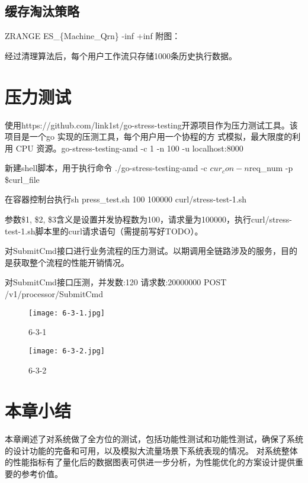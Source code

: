 \subsection{缓存淘汰策略}
ZRANGE ES\_\{Machine\_Qrn\} -inf +inf
附图：

经过清理算法后，每个用户工作流只存储1000条历史执行数据。


\section{压力测试}


使用https://github.com/link1st/go-stress-testing开源项目作为压力测试工具。该项目是一个go 实现的压测工具，每个用户用一个协程的方
式模拟，最大限度的利用 CPU 资源。go-stress-testing-amd -c 1 -n 100 -u localhost:8000

新建shell脚本，用于执行命令 ./go-stress-testing-amd -c $cur_con -n $req\_num -p \$curl\_file

在容器控制台执行sh press\_test.sh 100 100000 curl/stress-test-1.sh\cite{zw5}

参数\$1, \$2, \$3含义是设置并发协程数为100，请求量为100000，执行curl/stress-test-1.sh脚本里的curl请求语句（需提前写好TODO）。

对SubmitCmd接口进行业务流程的压力测试。以期调用全链路涉及的服务，目的是获取整个流程的性能开销情况。


对SubmitCmd接口压测，并发数:120 请求数:20000000
POST /v1/processor/SubmitCmd

\begin{figure}[H]
    \centering
    \texttt{[image: 6-3-1.jpg]}
    \caption{6-3-1}
    \label{fig:6-3-1}
\end{figure}

\begin{figure}[H]
    \centering
    \texttt{[image: 6-3-2.jpg]}
    \caption{6-3-2}
    \label{fig:6-3-2}
\end{figure}
%
%


\section{本章小结}

本章阐述了对系统做了全方位的测试，包括功能性测试和功能性测试，确保了系统的设计功能的完备和可用，以及模拟大流量场景下系统表现的情况。
对系统整体的性能指标有了量化后的数据图表可供进一步分析，为性能优化的方案设计提供重要的参考价值。